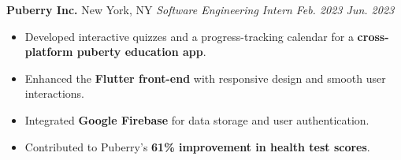 \documentclass[11pt,letterpaper]{article}
\begin{document}
\begin{list}{}{\setlength{\leftmargin}{1em}\setlength{\rightmargin}{2pt}}
    \item
        \normalsize{\textbf{Puberry Inc.}} \hfill New York, NY
          \vspace{2pt} \newline
          \small{\textit{Software Engineering Intern}} \hfill \small{\textit{Feb. 2023 \textendash \space Jun. 2023}}
          \vspace{0pt}
          \begin{itemize}[itemsep=-4pt, topsep=-2pt]
              \item Developed interactive quizzes and a progress-tracking calendar for a \textbf{cross-platform puberty education app}.
              \item Enhanced the \textbf{Flutter front-end} with responsive design and smooth user interactions.
              \item Integrated \textbf{Google Firebase} for data storage and user authentication.
              \item Contributed to Puberry's \textbf{61\% improvement in health test scores}.
          \end{itemize}
\end{list}

\end{document}
